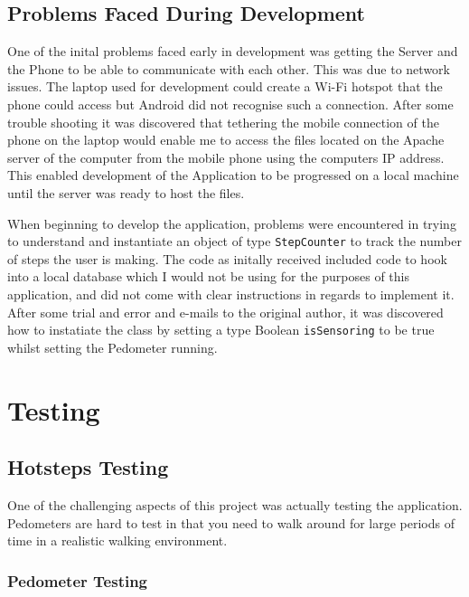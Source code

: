 \documentclass{l4proj}
\begin{document}
\section{Problems Faced During Development}

One of the inital problems faced early in development was getting the Server and the Phone to be able to communicate with each other. This was due to network issues. The laptop used for development could create a Wi-Fi hotspot that the phone could access but Android did not recognise such a connection. After some trouble shooting it was discovered that tethering the mobile connection of the phone on the laptop would enable me to access the files located on the Apache server of the computer from the mobile phone using the computers IP address. This enabled development of the Application to be progressed on a local machine until the server was ready to host the files. 

When beginning to develop the application, problems were encountered in trying to understand and instantiate an object of type \texttt{StepCounter} to track the number of steps the user is making. The code as initally received included code to hook into a local database which I would not be using for the purposes of this application, and did not come with clear instructions in regards to implement it. After some trial and error and e-mails to the original author, it was discovered how to instatiate the class by setting a type Boolean \texttt{isSensoring} to be true whilst setting the Pedometer running.


\chapter{Testing}

\section{Hotsteps Testing}

One of the challenging aspects of this project was actually testing the application. Pedometers are hard to test in that you need to walk around for large periods of time in a realistic walking environment.

\subsection{Pedometer Testing}
\end{document}
